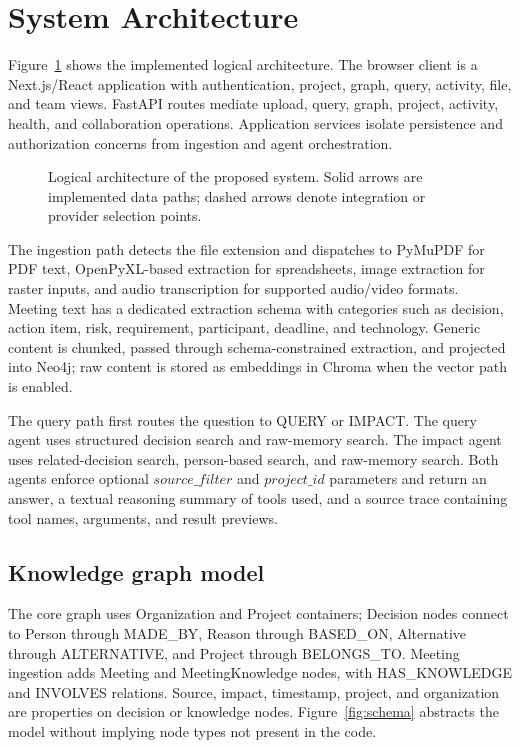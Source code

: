\documentclass[conference]{IEEEtran}
\newcommand{\system}{the proposed system}
\begin{document}
\section{System Architecture}
Figure~\ref{fig:architecture} shows the implemented logical architecture. The browser client is a Next.js/React application with authentication, project, graph, query, activity, file, and team views. FastAPI routes mediate upload, query, graph, project, activity, health, and collaboration operations. Application services isolate persistence and authorization concerns from ingestion and agent orchestration.

\begin{figure}[t]
\centering

\caption{Logical architecture of \system. Solid arrows are implemented data paths; dashed arrows denote integration or provider selection points.}
\label{fig:architecture}
\end{figure}

The ingestion path detects the file extension and dispatches to PyMuPDF for PDF text, OpenPyXL-based extraction for spreadsheets, image extraction for raster inputs, and audio transcription for supported audio/video formats. Meeting text has a dedicated extraction schema with categories such as decision, action item, risk, requirement, participant, deadline, and technology. Generic content is chunked, passed through schema-constrained extraction, and projected into Neo4j; raw content is stored as embeddings in Chroma when the vector path is enabled.

The query path first routes the question to QUERY or IMPACT. The query agent uses structured decision search and raw-memory search. The impact agent uses related-decision search, person-based search, and raw-memory search. Both agents enforce optional $source\_filter$ and $project\_id$ parameters and return an answer, a textual reasoning summary of tools used, and a source trace containing tool names, arguments, and result previews.

\subsection{Knowledge graph model}
The core graph uses Organization and Project containers; Decision nodes connect to Person through MADE\_BY, Reason through BASED\_ON, Alternative through ALTERNATIVE, and Project through BELONGS\_TO. Meeting ingestion adds Meeting and MeetingKnowledge nodes, with HAS\_KNOWLEDGE and INVOLVES relations. Source, impact, timestamp, project, and organization are properties on decision or knowledge nodes. Figure~\ref{fig:schema} abstracts the model without implying node types not present in the code.
\end{document}
